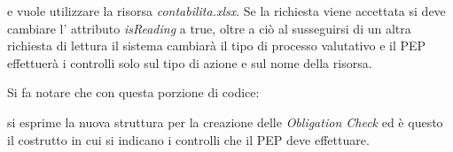 e vuole utilizzare la risorsa \emph{contabilita.xlsx}.
Se la richiesta viene accettata si deve cambiare l' attributo \emph{isReading} a true, oltre a ciò al susseguirsi
di un altra richiesta di lettura il sistema cambiarà il tipo di processo valutativo e il PEP effettuerà i controlli
solo sul tipo di azione e sul nome della risorsa.\par

\par Si fa notare che con questa porzione di codice:

si esprime la nuova struttura per la creazione delle \emph{Obligation Check} ed è questo il costrutto
in cui si indicano i controlli che il PEP deve effettuare.\\\par
